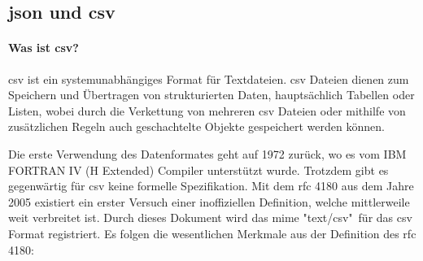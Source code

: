 \subsection{\acs{json} und \acs{csv}}
\paragraph{Was ist \acs{csv}?}
\acf{csv} ist ein systemunabhängiges Format für Textdateien. \acs{csv} Dateien dienen zum Speichern und Übertragen von strukturierten Daten, hauptsächlich Tabellen oder Listen, wobei durch die Verkettung von mehreren \acs{csv} Dateien oder mithilfe von zusätzlichen Regeln auch geschachtelte Objekte gespeichert werden können. \cite{FuchsMediaSolutions:o.J.}

Die erste Verwendung des Datenformates geht auf 1972 zurück, wo es vom IBM FORTRAN IV (H Extended) Compiler unterstützt wurde. Trotzdem gibt es gegenwärtig für \acs{csv} keine formelle Spezifikation. Mit dem \acs{rfc} 4180 \cite{Shafranovich:2005} aus dem Jahre 2005 existiert ein erster Versuch einer inoffiziellen Definition, welche mittlerweile weit verbreitet ist. Durch dieses Dokument wird das \acf{mime} "text/csv"\ für das \acs{csv} Format registriert. Es folgen die wesentlichen Merkmale aus der Definition des \acs{rfc} 4180:

